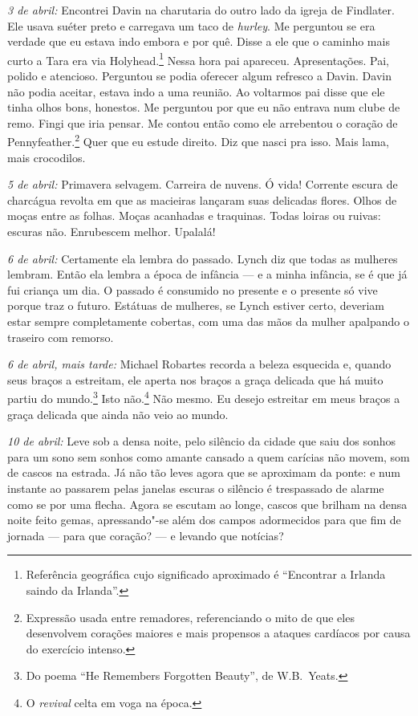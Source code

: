 \medskip\noindent\textit{3 de abril:} Encontrei Davin na charutaria do outro lado da
igreja de Findlater. Ele usava suéter preto e carregava um taco de
\textit{hurley}. Me perguntou se era verdade que eu estava indo embora
e por quê. Disse a ele que o caminho mais curto a Tara era via
Holyhead.\footnote{ Referência geográfica cujo significado aproximado é
“Encontrar a Irlanda saindo da Irlanda”.} Nessa hora pai apareceu.
Apresentações. Pai, polido e atencioso. Perguntou se podia oferecer
algum refresco a Davin. Davin não podia aceitar, estava indo a uma
reunião. Ao voltarmos pai disse que ele tinha olhos bons, honestos. Me
perguntou por que eu não entrava num clube de remo. Fingi que iria
pensar. Me contou então como ele arrebentou o coração de
Pennyfeather.\footnote{ Expressão usada entre remadores, referenciando o mito de  
que eles desenvolvem corações maiores e mais propensos a ataques
cardíacos por causa do exercício intenso.} Quer que eu estude direito.
Diz que nasci pra isso. Mais lama, mais crocodilos.

\medskip\noindent\textit{5 de abril:} Primavera selvagem. Carreira de nuvens. Ó vida!
Corrente escura de charcágua revolta em que as macieiras lançaram suas
delicadas flores. Olhos de moças entre as folhas. Moças acanhadas e
traquinas. Todas loiras ou ruivas: escuras não. Enrubescem melhor.
Upalalá!

\medskip\noindent\textit{6 de abril:} Certamente ela lembra do passado. Lynch diz que
todas as mulheres lembram. Então ela lembra a época de infância --- e a
minha infância, se é que já fui criança um dia. O passado é consumido
no presente e o presente só vive porque traz o futuro. Estátuas de
mulheres, se Lynch estiver certo, deveriam estar sempre completamente
cobertas, com uma das mãos da mulher apalpando o traseiro com remorso.

\medskip\noindent\textit{6 de abril, mais tarde:} Michael Robartes recorda a beleza
esquecida e, quando seus braços a estreitam, ele aperta nos braços a
graça delicada que há muito partiu do mundo.\footnote{ Do poema “He Remembers Forgotten Beauty”, de W.B.~Yeats.} 
Isto não.\footnote{ O \textit{revival} celta em voga na época.} Não mesmo. Eu desejo
estreitar em meus braços a graça delicada que ainda não veio ao mundo.

\medskip\noindent\textit{10 de abril:} Leve sob a densa noite, pelo silêncio da cidade
que saiu dos sonhos para um sono sem sonhos como amante cansado a quem
carícias não movem, som de cascos na estrada. Já não tão leves agora que se
aproximam da ponte: e num instante ao passarem pelas janelas escuras o
silêncio é trespassado de alarme como se por uma flecha. Agora se
escutam ao longe, cascos que brilham na densa noite feito gemas,
apressando"-se além dos campos adormecidos para que fim de jornada --- 
para que coração? --- e levando que notícias?

